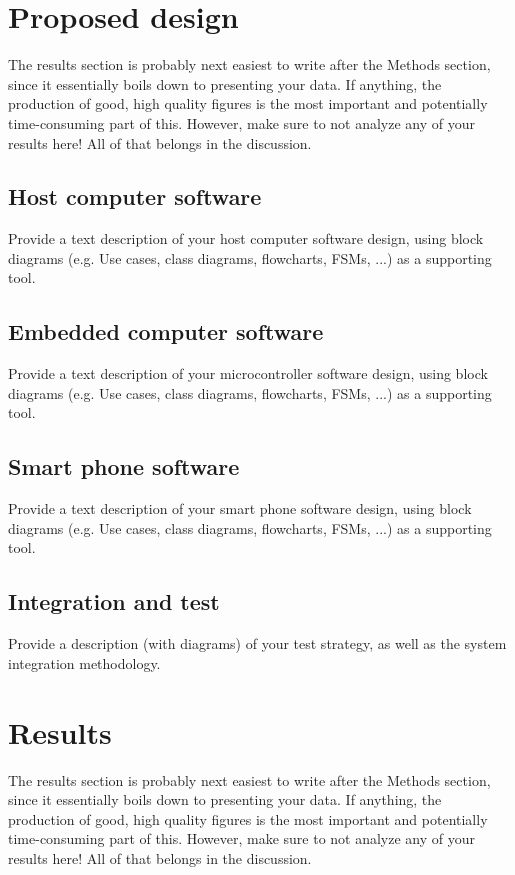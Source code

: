 \documentclass[10pt,twocolumn,letterpaper]{article}
\begin{document}
\section{Proposed design}

The results section is probably next easiest to write after the Methods section, since it essentially boils down to presenting your data. If anything, the production of good, high quality figures is the most important and potentially time-consuming part of this. However, make sure to not analyze any of your results here! All of that belongs in the discussion.


\subsection{Host computer software}

Provide a text description of your host computer software design, using block diagrams (e.g. Use cases, class diagrams, flowcharts, FSMs, ...) as a supporting tool.

\subsection{Embedded computer software}

Provide a text description of your microcontroller software design, using block diagrams (e.g. Use cases, class diagrams, flowcharts, FSMs, ...) as a supporting tool.


\subsection{Smart phone software}

Provide a text description of your smart phone software design, using block diagrams (e.g. Use cases, class diagrams, flowcharts, FSMs, ...) as a supporting tool.


\subsection{Integration and test}

Provide a description (with diagrams) of your test strategy, as well as the system integration methodology.

\section{Results}

The results section is probably next easiest to write after the Methods section, since it essentially boils down to presenting your data. If anything, the production of good, high quality figures is the most important and potentially time-consuming part of this. However, make sure to not analyze any of your results here! All of that belongs in the discussion.
\end{document}
